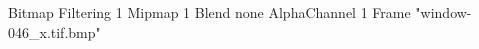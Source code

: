 {Bitmap
	{Filtering 1}
	{Mipmap 1}
	{Blend none}
	{AlphaChannel 1}
	{Frame "window-046_x.tif.bmp"}
}
